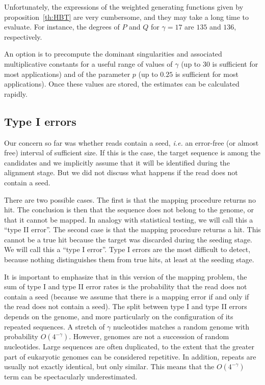 \documentclass{article}
\begin{document}
Unfortunately, the expressions of the weighted generating functions given
by proposition~\ref{th:HBT} are very cumbersome, and they may take a long
time to evaluate. For instance, the degrees of $P$ and $Q$ for $\gamma=17$
are $135$ and $136$, respectively.

An option is to precompute the dominant singularities and associated
multiplicative constants for a useful range of values of $\gamma$ (up to
$30$ is sufficient for most applications) and of the parameter $p$ (up to
$0.25$ is sufficient for most applications). Once these values are stored,
the estimates can be calculated rapidly.






\subsection{Type I errors}
\label{sec:fp}


Our concern so far was whether reads contain a seed, \textit{i.e.} an
error-free (or almost free) interval of sufficient size. If this is the
case, the target sequence is among the candidates and we implicitly assume
that it will be identified during the alignment stage. But we did not
discuss what happens if the read does not contain a seed.

There are two possible cases. The first is that the mapping procedure
returns no hit. The conclusion is then that the sequence does not belong
to the genome, or that it cannot be mapped. In analogy with statistical
testing, we will call this a ``type II error''. The second case is that
the mapping procedure returns a hit. This cannot be a true hit because the
target was discarded during the seeding stage. We will call this a ``type
I error''. Type I errors are the most difficult to detect, because nothing
distinguishes them from true hits, at least at the seeding stage.

It is important to emphasize that in this version of the mapping problem,
the sum of type I and type II error rates is the probability that the read
does not contain a seed (because we assume that there is a mapping error
if and only if the read does not contain a seed). The split between type I
and type II errors depends on the genome, and more particularly on the
configuration of its repeated sequences. A stretch of $\gamma$ nucleotides
matches a random genome with probability $O(4^{-\gamma})$. However,
genomes are not a succession of random nucleotides. Large sequences are
often duplicated, to the extent that the greater part of eukaryotic
genomes can be considered repetitive. In addition, repeats are usually not
exactly identical, but only similar. This means that the $O(4^{-\gamma})$
term can be spectacularly underestimated.
\end{document}

